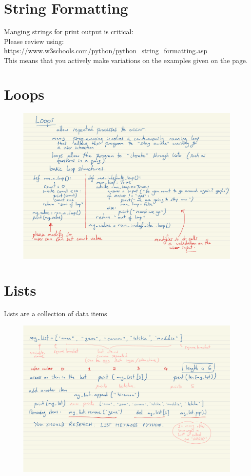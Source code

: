 \documentclass[a4paper,12pt]{article}
\begin{document}
\section{String Formatting}
Manging strings for print output is critical:\\

Please review using:\\
\url{https://www.w3schools.com/python/python_string_formatting.asp}\\
This means that you actively make variations on the examples given on the page.
\section{Loops} 
\begin{figure}[!ht]
	\centering
	\includegraphics[width=15cm]{loops.pdf}
\end{figure}
\newpage
\section{Lists}
Lists are a collection of data items

\begin{figure}[!ht]
	\centering
	\includegraphics[width=15cm]{lists.pdf}
\end{figure}
\end{document}
